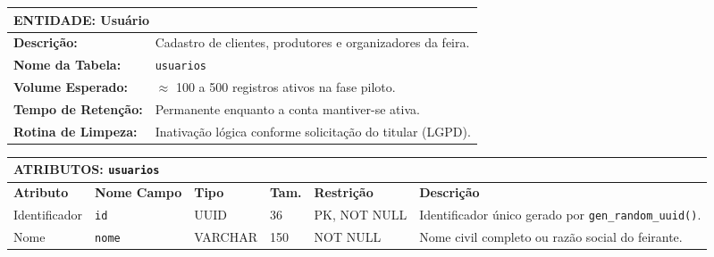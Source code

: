 \documentclass[12pt,a4paper]{article}
\begin{document}

\begin{spacing}{1.0}

\small

\noindent

\begin{tabularx}{\textwidth}{|p{3.0cm}|X|}

\hline

\multicolumn{2}{|l|}{\textbf{ENTIDADE: Usuário}} \\ \hline

\textbf{Descrição:} & Cadastro de clientes, produtores e organizadores da feira. \\ \hline

\textbf{Nome da Tabela:} & \texttt{usuarios} \\ \hline

\textbf{Volume Esperado:} & $\approx$ 100 a 500 registros ativos na fase piloto. \\ \hline

\textbf{Tempo de Retenção:} & Permanente enquanto a conta mantiver-se ativa. \\ \hline

\textbf{Rotina de Limpeza:} & Inativação lógica conforme solicitação do titular (LGPD). \\ \hline

\end{tabularx}

\vspace{0.25cm}

\noindent

\begin{tabularx}{\textwidth}{|p{1.6cm}|p{1.9cm}|p{1.2cm}|p{0.7cm}|p{1.9cm}|X|}

\hline

\multicolumn{6}{|l|}{\textbf{ATRIBUTOS: \texttt{usuarios}}} \\ \hline

\textbf{Atributo} & \textbf{Nome Campo} & \textbf{Tipo} & \textbf{Tam.} & \textbf{Restrição} & \textbf{Descrição} \\ \hline

Identificador & \texttt{id} & UUID & 36 & PK, NOT NULL & Identificador único gerado por \texttt{gen\_random\_uuid()}. \\ \hline

Nome & \texttt{nome} & VARCHAR & 150 & NOT NULL & Nome civil completo ou razão social do feirante. \\ \hline


\end{tabularx}
\end{spacing}
\end{document}
